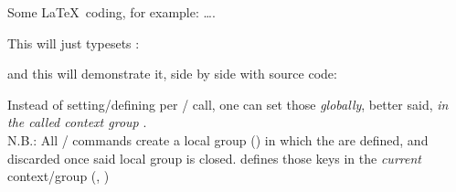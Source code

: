 \documentclass[dctools,english]{ufrgscca}
\begin{document}
\begin{stcode}[st=demostcode]
	\begin{stcode}[st=stmeta]
		Some \LaTeX~coding, for example: \ldots.
\end{stcode}
This will just typesets :


and this will demonstrate it, side by side with source code:

\end{stcode}


\begin{Macros}{\setdclisting}
	\begin{Syntax}%
	\end{Syntax}
Instead of setting/defining  per \Macro{\Demo}{}/\Macro{\Display}{} call, one can set those \emph{globally}, better said, \emph{in the called context group} .\\
N.B.: All \Macro{\Display}{}/\Macro{\Demo}{} commands create a local group (\Macro{\begingroup}{}) in which the  are defined, and discarded once said local group is closed. \Macro{\setdclisting}{} defines those keys in the \emph{current} context/group (\Macro{\def}{}, \Macro{\edef}{})
\end{Macros}
\end{document}
